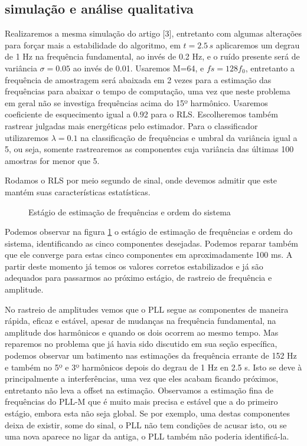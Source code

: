 \subsection{simulação e análise qualitativa}
Realizaremos a mesma simulação do artigo [3], entretanto com algumas alterações para forçar mais a estabilidade do algoritmo, em $t=2.5 \, s$ aplicaremos um degrau de 1 Hz na frequência fundamental, ao invés de 0.2 Hz, e o ruído presente será de variância $\sigma=0.05$ ao invés de 0.01. Usaremos M=64, e $fs=128f_0$, entretanto a frequência de amostragem será abaixada em 2 vezes para a estimação das frequências para abaixar o tempo de computação, uma vez que neste problema em geral não se investiga frequências acima do 15º harmônico. Usaremos coeficiente de esquecimento igual a 0.92 para o RLS. Escolheremos também rastrear julgadas mais energéticas pelo estimador. Para o classificador utilizaremos $\lambda=0.1$ na classificação de frequências e umbral da variância igual a 5, ou seja, somente rastrearemos as componentes cuja variância das últimas 100 amostras for menor que 5. 

Rodamos o RLS por meio segundo de sinal, onde devemos admitir que este mantém suas características estatísticas.

\begin{figure}[H]
	\centering    
	\def\svgwidth{\columnwidth}
	
	\caption{Estágio de estimação de frequências e ordem do sistema}
	\label{fig:estagio_1}
\end{figure}

Podemos observar na figura \ref{fig:estagio_1} o estágio de estimação de frequências e ordem do sistema, identificando as cinco componentes desejadas. Podemos reparar também que ele converge para estas cinco componentes em aproximadamente 100 ms. A partir deste momento já temos os valores corretos estabilizados e já são adequados para passarmos ao próximo estágio, de rastreio de frequência e amplitude. 

\indent No rastreio de amplitudes vemos que o PLL segue as componentes de maneira rápida, eficaz e estável, apesar de mudanças na frequência fundamental, na amplitude dos harmônicos e quando os dois ocorrem ao mesmo tempo. Mas reparemos no problema que já havia sido discutido em sua seção específica, podemos observar um batimento nas estimações da frequência errante de 152 Hz e também no 5º e 3º harmônicos depois do degrau de 1 Hz en 2.5 s. Isto se deve à principalmente a interferências, uma vez que eles acabam ficando próximos, entretanto não leva a offset na estimação.
\indent Observamos a estimação fina de frequências do PLL-M que é muito mais precisa e estável que a do primeiro estágio, embora esta não seja global. Se por exemplo, uma destas componentes deixa de existir, some do sinal, o PLL não tem condições de acusar isto, ou se uma nova aparece no ligar da antiga, o PLL também não poderia identificá-la.

